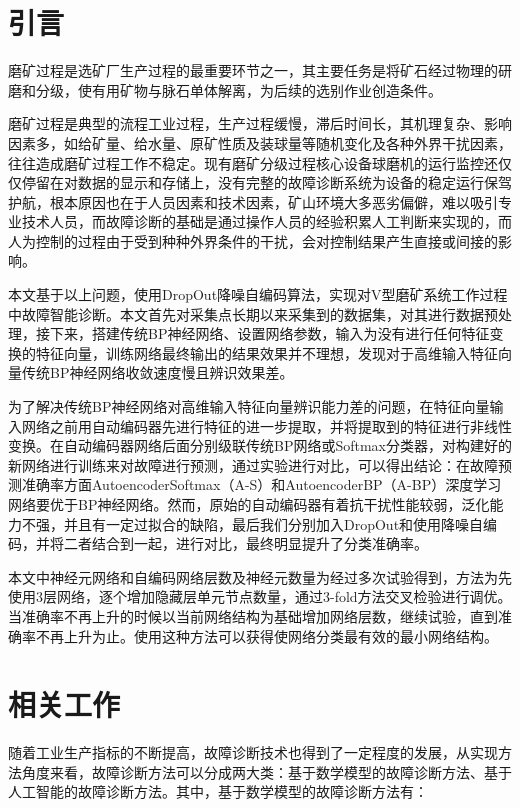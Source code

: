 \documentclass{ctacn}%
\begin{document}
\begin{multicols}{2}
\section{引\quad 言}
磨矿过程是选矿厂生产过程的最重要环节之一，其主要任务是将矿石经过物理的研磨和分级，使有用矿物与脉石单体解离，为后续的选别作业创造条件。

磨矿过程是典型的流程工业过程，生产过程缓慢，滞后时间长，其机理复杂、影响因素多，如给矿量、给水量、原矿性质及装球量等随机变化及各种外界干扰因素，往往造成磨矿过程工作不稳定。现有磨矿分级过程核心设备球磨机的运行监控还仅仅停留在对数据的显示和存储上，没有完整的故障诊断系统为设备的稳定运行保驾护航，根本原因也在于人员因素和技术因素，矿山环境大多恶劣偏僻，难以吸引专业技术人员，而故障诊断的基础是通过操作人员的经验积累人工判断来实现的，而人为控制的过程由于受到种种外界条件的干扰，会对控制结果产生直接或间接的影响。

本文基于以上问题，使用DropOut降噪自编码算法，实现对V型磨矿系统工作过程中故障智能诊断。本文首先对采集点长期以来采集到的数据集，对其进行数据预处理，接下来，搭建传统BP神经网络、设置网络参数，输入为没有进行任何特征变换的特征向量，训练网络最终输出的结果效果并不理想，发现对于高维输入特征向量传统BP神经网络收敛速度慢且辨识效果差。

为了解决传统BP神经网络对高维输入特征向量辨识能力差的问题，在特征向量输入网络之前用自动编码器先进行特征的进一步提取，并将提取到的特征进行非线性变换。在自动编码器网络后面分别级联传统BP网络或Softmax分类器，对构建好的新网络进行训练来对故障进行预测，通过实验进行对比，可以得出结论：在故障预测准确率方面AutoencoderSoftmax（A-S）和AutoencoderBP（A-BP）深度学习网络要优于BP神经网络。然而，原始的自动编码器有着抗干扰性能较弱，泛化能力不强，并且有一定过拟合的缺陷，最后我们分别加入DropOut和使用降噪自编码，并将二者结合到一起，进行对比，最终明显提升了分类准确率。

本文中神经元网络和自编码网络层数及神经元数量为经过多次试验得到，方法为先使用3层网络，逐个增加隐藏层单元节点数量，通过3-fold方法交叉检验进行调优。当准确率不再上升的时候以当前网络结构为基础增加网络层数，继续试验，直到准确率不再上升为止。使用这种方法可以获得使网络分类最有效的最小网络结构。

\section{相关工作}
随着工业生产指标的不断提高，故障诊断技术也得到了一定程度的发展，从实现方法角度来看，故障诊断方法可以分成两大类：基于数学模型的故障诊断方法、基于人工智能的故障诊断方法。其中，基于数学模型的故障诊断方法有：


\end{multicols}
\end{document}
